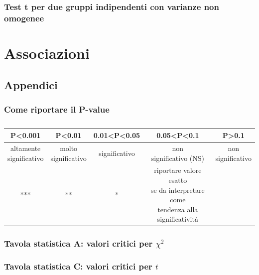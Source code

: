 \documentclass[10pt, draft]{book}
\begin{document}
\section{Test \texorpdfstring{t}{Lg} per due gruppi indipendenti con varianze non omogenee}

\part{Associazioni}

\chapter{}

\section{}

\chapter{Appendici}

\section{Come riportare il P-value}

\begin{table}[H]
    \centering
    \renewcommand\arraystretch{1.2}
    \begin{tabular}{c|c|c|c|c}
    \hline
    \textbf{P<0.001} & \textbf{P<0.01} & \textbf{0.01<P<0.05} & \textbf{0.05<P<0.1} & \textbf{P>0.1}\\
    \hline
    \makecell{altamente\\significativo} & \makecell{molto\\significativo} & significativo & \makecell{non\\significativo (NS)} & \makecell{non\\significativo}\\
    \hline
    *** & ** & * & \makecell{riportare valore esatto\\se da interpretare come\\tendenza alla significatività}\\
    \hline
    \end{tabular}
    \caption{\small{}}
    \label{tabpvalue}
\end{table}\noindent

\section{Tavola statistica A: valori critici per \texorpdfstring{$\chi^2$}{Lg}}

\section{Tavola statistica C: valori critici per \texorpdfstring{$t$}{Lg}}
\end{document}
